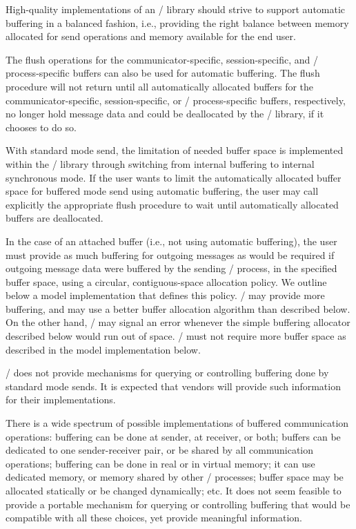 \begin{implementors}
High-quality implementations of an \MPI/ library should strive to support automatic buffering in a balanced fashion, i.e., providing the right balance between memory allocated for send operations and memory available for the end user.
\end{implementors}

The flush operations for the communicator-specific, session-specific, and \MPI/ process-specific buffers
can also be used for automatic buffering. The flush procedure will not return until all automatically allocated buffers
for the communicator-specific, session-specific, or \MPI/ process-specific buffers, respectively, no longer hold message data and could be deallocated by the \MPI/ library, if it chooses to do so.

\begin{users}
With standard mode send, the limitation of needed buffer space is implemented within
the \MPI/ library through switching from internal buffering to internal synchronous mode.
If the user wants to limit the automatically allocated buffer space for buffered mode send
using automatic buffering, the user may call explicitly the appropriate flush procedure to wait
until automatically allocated buffers are deallocated.
\end{users}

In the case of an attached buffer (i.e., not using automatic buffering),
the user must provide as much buffering for outgoing messages as would be required if
outgoing message
data were buffered by the sending \MPI/ process, in the specified buffer space,
using a circular, contiguous-space allocation policy.
We outline below a model implementation that defines this policy.
\MPI/ may provide more buffering, and may use a better buffer allocation
algorithm than described below.
On the other hand, \MPI/ may signal an error whenever the
simple buffering allocator described below would run out of space.
\MPI/ must not require more buffer space as described in the model implementation below.



\MPI/ does not provide mechanisms for querying or controlling buffering done by
standard mode sends.  It is expected that vendors will provide such
information
for their implementations.

\begin{rationale}
There is a wide spectrum of possible implementations of buffered communication operations:
buffering can be done at sender, at receiver, or both; buffers can be dedicated
to one sender-receiver pair, or be shared by
all communication operations; buffering can be done in real or
in virtual memory; it can use dedicated memory, or memory shared by other
\MPI/ processes; buffer space may be allocated statically or be changed dynamically;
etc.  It does not seem feasible to provide a portable mechanism for querying
or controlling buffering that would be compatible with all these choices, yet
provide meaningful information.
\end{rationale}


